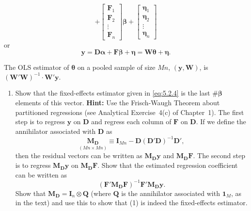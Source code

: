 \begin{problemset}
\[  + \begin{bmatrix} \mathbf{F}_1 \\ \mathbf{F}_2 \\ \vdots \\ \mathbf{F}_n \end{bmatrix}\boldsymbol{\beta}
  + \begin{bmatrix} \boldsymbol{\eta}_1 \\ \boldsymbol{\eta}_2 \\ \vdots \\ \boldsymbol{\eta}_n \end{bmatrix}
\]
or
\begin{equation}
  \mathbf{y} = \mathbf{D}\boldsymbol{\alpha} + \mathbf{F}\boldsymbol{\beta} + \boldsymbol{\eta}
  = \mathbf{W}\boldsymbol{\theta} + \boldsymbol{\eta}. \tag{3}
\end{equation}

The OLS estimator of $\boldsymbol{\theta}$ on a pooled sample of size $Mn$, $(\mathbf{y}, \mathbf{W})$, is
$(\mathbf{W}'\mathbf{W})^{-1}\cdot\mathbf{W}'\mathbf{y}$.

\begin{enumerate}[label=(\alph*)]
\item Show that the fixed-effects estimator given in \eqref{eq:5.2.4} is the last $\#\boldsymbol{\beta}$ elements
  of this vector. \textbf{Hint:} Use the Frisch-Waugh Theorem about partitioned
  regressions (see Analytical Exercise~4(c) of Chapter~1). The first
  step is to regress $\mathbf{y}$ on $\mathbf{D}$ and regress each column of $\mathbf{F}$ on $\mathbf{D}$. If we define
  the annihilator associated with $\mathbf{D}$ as
  \begin{equation}
    \underset{(Mn \times Mn)}{\mathbf{M}_\mathbf{D}}
    \equiv \mathbf{I}_{Mn} - \mathbf{D}(\mathbf{D}'\mathbf{D})^{-1}\mathbf{D}', \tag{4}
  \end{equation}
  then the residual vectors can be written as $\mathbf{M}_\mathbf{D}\mathbf{y}$ and
  $\mathbf{M}_\mathbf{D}\mathbf{F}$. The second step
  is to regress $\mathbf{M}_\mathbf{D}\mathbf{y}$ on $\mathbf{M}_\mathbf{D}\mathbf{F}$.
  Show that the estimated regression coefficient
  can be written as
  \begin{equation}
    (\mathbf{F}'\mathbf{M}_\mathbf{D}\mathbf{F})^{-1}\mathbf{F}'\mathbf{M}_\mathbf{D}\mathbf{y}. \tag{5}
  \end{equation}
  Show that $\mathbf{M}_\mathbf{D} = \mathbf{I}_n \otimes \mathbf{Q}$ (where $\mathbf{Q}$ is the annihilator associated with $\mathbf{1}_M$, as
  in the text) and use this to show that (1) is indeed the fixed-effects estimator.


\end{enumerate}
\end{problemset}
